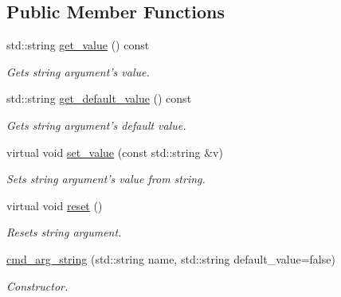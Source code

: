 \subsection*{Public Member Functions}
\begin{DoxyCompactItemize}
\item 
\hypertarget{classcmd__arg__string_a429f6c147a44c4e89162f194bf96fb2a}{std\-::string \hyperlink{classcmd__arg__string_a429f6c147a44c4e89162f194bf96fb2a}{get\-\_\-value} () const }\label{classcmd__arg__string_a429f6c147a44c4e89162f194bf96fb2a}

\begin{DoxyCompactList}\small\item\em Gets string argument's value. \end{DoxyCompactList}\item 
\hypertarget{classcmd__arg__string_a1bb4bd09605e452c4dd9406bd8d52f16}{std\-::string \hyperlink{classcmd__arg__string_a1bb4bd09605e452c4dd9406bd8d52f16}{get\-\_\-default\-\_\-value} () const }\label{classcmd__arg__string_a1bb4bd09605e452c4dd9406bd8d52f16}

\begin{DoxyCompactList}\small\item\em Gets string argument's default value. \end{DoxyCompactList}\item 
\hypertarget{classcmd__arg__string_a434d6b2a9a6ae7e35043113cc0551140}{virtual void \hyperlink{classcmd__arg__string_a434d6b2a9a6ae7e35043113cc0551140}{set\-\_\-value} (const std\-::string \&v)}\label{classcmd__arg__string_a434d6b2a9a6ae7e35043113cc0551140}

\begin{DoxyCompactList}\small\item\em Sets string argument's value from string. \end{DoxyCompactList}\item 
\hypertarget{classcmd__arg__string_aacc88a0b8b77fc736ae2e475e03bbdcd}{virtual void \hyperlink{classcmd__arg__string_aacc88a0b8b77fc736ae2e475e03bbdcd}{reset} ()}\label{classcmd__arg__string_aacc88a0b8b77fc736ae2e475e03bbdcd}

\begin{DoxyCompactList}\small\item\em Resets string argument. \end{DoxyCompactList}\item 
\hyperlink{classcmd__arg__string_a25dc37fe19abaad0be2bce2a7956c27d}{cmd\-\_\-arg\-\_\-string} (std\-::string name, std\-::string default\-\_\-value=false)
\begin{DoxyCompactList}\small\item\em Constructor. \end{DoxyCompactList}\end{DoxyCompactItemize}


